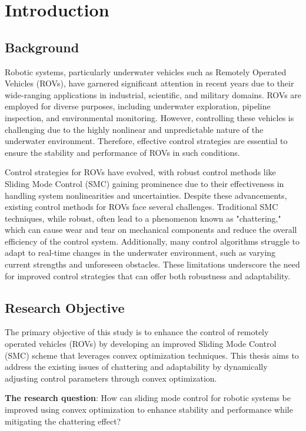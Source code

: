 \chapter{Introduction}
\label{chap:intro}

\section{Background}
Robotic systems, particularly underwater vehicles such as Remotely Operated Vehicles 
(ROVs), have garnered significant attention in recent years due to their wide-ranging 
applications in industrial, scientific, and military domains. ROVs are employed for 
diverse purposes, including underwater exploration, pipeline inspection, and 
environmental monitoring. However, controlling these vehicles is challenging due to 
the highly nonlinear and unpredictable nature of the underwater environment. 
Therefore, effective control strategies are essential to ensure the stability and 
performance of ROVs in such conditions.

Control strategies for ROVs have evolved, with robust 
control methods like Sliding Mode Control (SMC) gaining prominence due to their 
effectiveness in handling system nonlinearities and uncertainties.
Despite these advancements, existing control methods for ROVs face several 
challenges. Traditional SMC techniques, while robust, often lead to a phenomenon 
known as "chattering," which can cause wear and tear on mechanical components and 
reduce the overall efficiency of the control system. Additionally, many control 
algorithms struggle to adapt to real-time changes in the underwater environment, 
such as varying current strengths and unforeseen obstacles. These limitations 
underscore the need for improved control strategies that can offer both robustness 
and adaptability.

\section{Research Objective}

The primary objective of this study is to enhance the control of remotely 
operated vehicles (ROVs) by developing an improved Sliding Mode Control 
(SMC) scheme that leverages convex optimization techniques. This thesis aims to 
address the existing issues of chattering and adaptability by dynamically 
adjusting control parameters through convex optimization.

\textbf{The research question}: 
How can sliding mode control for robotic systems be improved using convex 
optimization to enhance stability and performance while mitigating 
the chattering effect?

